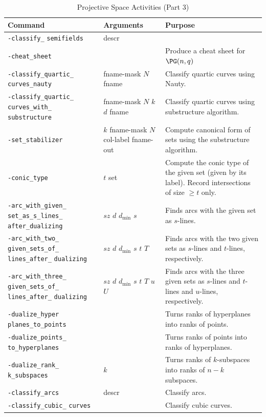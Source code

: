 \begin{table}
	\begin{center}
	\begin{tabular}{|p{4cm}|p{3cm}|p{7cm}|}
		\hline
		Command & Arguments & Purpose \\
		\hline
		\hline
		\verb'-classify_' \verb'semifields' & descr   &   \\
		\hline
		\verb'-cheat_sheet' &    & Produce a cheat sheet for $\PG(n,q)$  \\
		\hline
		\verb'-classify_quartic_' \verb'curves_nauty' & fname-mask $N$  fname & Classify quartic curves using Nauty.  \\
		\hline
		\verb'-classify_quartic_' \verb'curves_with_' \verb'substructure' & fname-mask $N$  $k$ $d$ fname & Classify quartic curves using substructure algorithm.  \\
		\hline
		\verb'-set_stabilizer' & $k$ fname-mask $N$  col-label fname-out & Compute canonical form of sets using the substructure algorithm. \\
		\hline
		\verb'-conic_type' & $t$ set & Compute the conic type of the given set (given by its label). Record intersections of size $\ge t$ only.   \\
		\hline
		\verb'-arc_with_given_' \verb'set_as_s_lines_' \verb'after_dualizing' & $sz$ $d$ $d_{\min}$ $s$  & 
		Finds arcs with the given set as $s$-lines. \\
		\hline
		\verb'-arc_with_two_' \verb'given_sets_of_' \verb'lines_after_' \verb'dualizing' & $sz$ $d$ $d_{\min}$ $s$  $t$ $T$ & 
		Finds arcs with the two given sets as $s$-lines and $t$-lines, respectively. \\
		\hline
		\verb'-arc_with_three_' \verb'given_sets_of_' \verb'lines_after_' \verb'dualizing' & $sz$ $d$ $d_{\min}$ $s$  $t$ $T$  $u$ $U$ & 
		Finds arcs with the three given sets as $s$-lines and $t$-lines and $u$-lines, respectively. \\
		\hline
		\verb'-dualize_hyper' \verb'planes_to_points' & & Turns ranks of hyperplanes into ranks of points. \\
		\hline
		\verb'-dualize_points_' \verb'to_hyperplanes' & & Turns ranks of points into ranks of hyperplanes. \\
		\hline
		\verb'-dualize_rank_' \verb'k_subspaces' & $k$ & Turns ranks of $k$-subspaces into ranks of $n-k$ subspaces. \\
		\hline
		\verb'-classify_arcs' & descr  & Classify arcs. \\
		\hline
		\verb'-classify_cubic_' \verb'curves' &   & Classify cubic curves. \\
		\hline
		\end{tabular}
	\end{center}
	\caption{\label{tab:projective:space:activities:3}Projective Space Activities (Part 3)}
\end{table}
